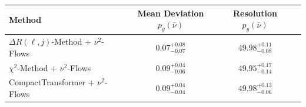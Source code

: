     \begin{tabular}{lccc}
        \toprule
        Method & Mean Deviation $p_{y}(\bar{\nu})$ & Resolution $p_{y}(\bar{\nu})$ \\
        \midrule
        $\Delta R(\ell,j)$-Method + $\nu^2$-Flows & $0.07^{+0.08}_{-0.07}$ & $49.98^{+0.11}_{-0.08}$ \\
        $\chi^2$-Method + $\nu^2$-Flows & $0.09^{+0.04}_{-0.06}$ & $49.95^{+0.17}_{-0.14}$ \\
        CompactTransformer + $\nu^2$-Flows & $0.09^{+0.04}_{-0.04}$ & $49.98^{+0.13}_{-0.06}$ \\
        \bottomrule
    \end{tabular}